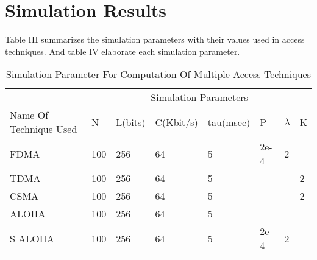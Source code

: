 \documentclass[11pt, conference, compsocconf, onecolumn]{IEEEtran}
\begin{document}
\section{Simulation Results}
Table III summarizes the simulation parameters with their values used in access techniques. And table IV elaborate each simulation parameter.
\begin{table*}
\caption{Simulation Parameter For Computation Of Multiple Access Techniques}
\begin{center}
\begin{tabular}{ | p{3cm} | p{1.5cm}| p{1.5cm}|p{1.5cm}|p{1.5cm}|p{1.5cm}|p{1.5cm}|p{1.5cm}|}
    \hline
    &\multicolumn {7}{c}{Simulation Parameters}\\ \cline{2-8}

     Name Of Technique Used & N & L(bits) & C(Kbit/s) & tau(msec)& P & $\lambda$ & K\\ \hline
     FDMA   & 100&256&64&5&2e-4	&2&  \\ \hline
     TDMA	& 100&256&64&5&	&&2  \\ \hline
     CSMA   & 100&256&64&5&  &&2  \\ \hline
     ALOHA  & 100&256&64&5&  &&  \\ \hline
     S ALOHA& 100&256&64&5&2e-4 &2&  \\ \hline
     \end{tabular}
     \end{center}
\end{table*}
\end{document}
